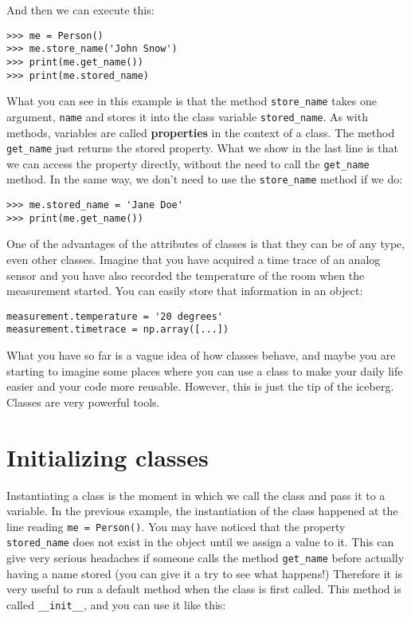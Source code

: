 And then we can execute this:

\begin{verbatim}
>>> me = Person()
>>> me.store_name('John Snow')
>>> print(me.get_name())
>>> print(me.stored_name)
\end{verbatim}

What you can see in this example is that the method \texttt{store_name}
takes one argument, \texttt{name} and stores it into the class variable
\texttt{stored_name}. As with methods, variables are called \textbf{properties}
in the context of a class. The method \texttt{get_name} just returns
the stored property. What we show in the last line is that we can access
the property directly, without the need to call the \texttt{get_name}
method. In the same way, we don't need to use the \texttt{store_name}
method if we do:

\begin{verbatim}
>>> me.stored_name = 'Jane Doe'
>>> print(me.get_name())
\end{verbatim}

One of the advantages of the attributes of classes is that they can be
of any type, even other classes. Imagine that you have acquired a time trace
of an analog sensor and you have also recorded the temperature of the
room when the measurement started. You can easily store that information
in an object:

\begin{verbatim}
measurement.temperature = '20 degrees'
measurement.timetrace = np.array([...])
\end{verbatim}

What you have so far is a vague idea of how classes behave, and maybe
you are starting to imagine some places where you can use a class to
make your daily life easier and your code more reusable. However, this
is just the tip of the iceberg. Classes are very powerful
tools.

\section{Initializing classes}\label{initializing-classes}
Instantiating a class is the moment in which we call the class and pass
it to a variable. In the previous example, the instantiation of the
class happened at the line reading \texttt{me = Person()}. You may
have noticed that the property \texttt{stored_name} does not exist in
the object until we assign a value to it. This can give very serious
headaches if someone calls the method \texttt{get_name} before actually
having a name stored (you can give it a try to see what happens!)
Therefore it is very useful to run a default method when the class is
first called. This method is called \texttt{__init__}, and you can
use it like this:

